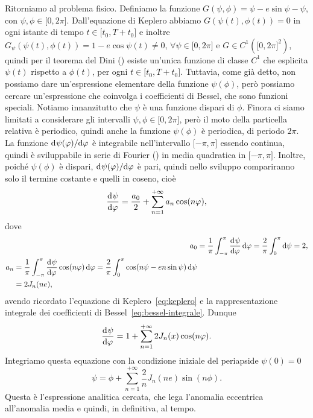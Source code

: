 Ritorniamo al problema fisico. Definiamo la funzione $G(\psi,\phi) = \psi -
e\sin\psi - \psi$, con $\psi,\phi\in\mathopen{[}0,
2\pi\mathclose{]}$. Dall'equazione di Keplero abbiamo $G(\psi(t),\phi(t)) = 0$
in ogni istante di tempo $t\in\mathopen{[}t_0,T+t_0\mathclose{]}$ e inoltre
$G_\psi(\psi(t),\phi(t)) = 1 - e\cos\psi(t) \neq 0$,
$\forall\psi\in\mathopen{[}0, 2\pi\mathclose{]}$ e $G\in C^1(\mathopen{[}0,
2\pi\mathclose{]}^2)$, quindi per il teorema del Dini
(\textcite{demarco:analisi2}) esiste un'unica funzione di classe $C^1$ che
esplicita $\psi(t)$ rispetto a $\phi(t)$, per ogni
$t\in\mathopen{[}t_0,T+t_0\mathclose{]}$. Tuttavia, come già detto, non possiamo
dare un'espressione elementare della funzione $\psi(\phi)$, però possiamo
cercare un'espressione che coinvolga i coefficienti di Bessel, che sono funzioni
speciali. Notiamo innanzitutto che $\psi$ è una funzione dispari di
$\phi$. Finora ci siamo limitati a considerare gli intervalli
$\psi,\phi\in\mathopen{[}0, 2\pi\mathclose{]}$, però il moto della particella
relativa è periodico, quindi anche la funzione $\psi(\phi)$ è periodica, di
periodo $2\pi$.  La funzione $\mathrm{d}^{}\psi(\varphi) / \mathrm{d} {\varphi}^{}$ è integrabile
nell'intervallo $\mathopen{[}-\pi, \pi\mathclose{]}$ essendo continua, quindi è
sviluppabile in serie di Fourier (\textcite{demarco:analisi2}) in media
quadratica in $\mathopen{[}-\pi, \pi\mathclose{]}$. Inoltre, poiché $\psi(\phi)$
è dispari, $\mathrm{d}^{}\psi(\varphi) / \mathrm{d} {\varphi}^{}$ è pari, quindi nello sviluppo
compariranno solo il termine costante e quelli in coseno, cioè
\begin{equation}
  \frac{{\mathop{}\!\mathrm{d}^{}}\psi}{\mathop{}\!\mathrm{d} {\varphi}^{}} = \frac{a_0}{2} + \sum_{n=1}^{+\infty}a_n\cos(n\varphi),
\end{equation}
dove
\begin{align}
  a_0 &= \frac{1}{\pi}\int_{-\pi}^{\pi}\toder{\psi}{\phi}\dd\phi =
  \frac{2}{\pi}\int_0^\pi\dd\psi = 2,\\
  \begin{split}
    a_n &= \frac{1}{\pi}\int_{-\pi}^\pi\toder{\psi}{\phi}\cos(n\phi)\dd\phi =
    \frac{2}{\pi}\int_0^\pi\cos(n\psi - en\sin\psi)\dd\psi \\
    &= 2J_n(ne),
  \end{split}
\end{align}
avendo ricordato l'equazione di Keplero~\eqref{eq:keplero} e la rappresentazione
integrale dei coefficienti di Bessel~\eqref{eq:bessel-integrale}. Dunque
\begin{equation}
  \frac{{\mathop{}\!\mathrm{d}^{}}\psi}{\mathop{}\!\mathrm{d} {\varphi}^{}} = 1 + \sum_{n=1}^{+\infty}2J_n(x)\cos(n\varphi).
\end{equation}
Integriamo questa equazione con la condizione iniziale del periapside $\psi(0) =
0$
\begin{equation}
  \psi = \phi + \sum_{n=1}^{+\infty}\frac{2}{n}J_n(ne)\sin(n\phi).
\end{equation}
Questa è l'espressione analitica cercata, che lega l'anomalia eccentrica
all'anomalia media e quindi, in definitiva, al tempo.

